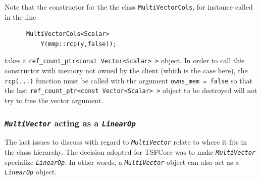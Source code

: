\noindent Note that the constructor for the the class \texttt{MultiVectorCols},
for instance called in the line

{\scriptsize\begin{verbatim}
      MultiVectorCols<Scalar>
          Y(mmp::rcp(y,false));
\end{verbatim}}

\noindent takes a \texttt{ref\_count\_ptr<const Vector<Scalar> >} object.  In
order to call this constructor with memory not owned by the client
(which is the case here), the \texttt{rcp(...)} function must be
called with the argument \texttt{owns\_mem = false} so that the last
\texttt{ref\_count\_ptr<const Vector<Scalar> >} object to be destroyed
will not try to free the vector argument.

%
\subsubsection{\texttt{\textit{Multi\-Vector}} acting as a \texttt{\textit{LinearOp}}}
\label{tsfcore:sec:multi_vec_linear_op}
%

The last issues to discuss with regard to
\texttt{\textit{Multi\-Vector}} relate to where it fits in the class
hierarchy.  The decision adopted for TSFCore was to make
\texttt{\textit{Multi\-Vector}} specialize \texttt{\textit{LinearOp}}.
In other words, a \texttt{\textit{Multi\-Vector}} object can also act as
a \texttt{\textit{LinearOp}} object.

